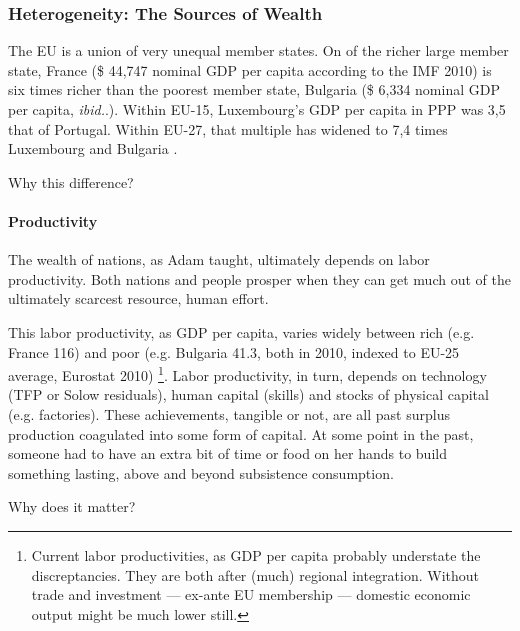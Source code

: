 \documentclass[11pt,a4paper,oneside,openright]{article}
\begin{document}
\subsubsection[Heterogeneity]{Heterogeneity: The Sources of Wealth} \label{sec:sources_of_wealth} The \gls{EU} is a union of very unequal member states. 
On of the richer large member state, France (\$ 44,747 nominal \gls{GDP} per capita according to the IMF 2010) is six times richer than the poorest member state, Bulgaria (\$ 6,334 nominal \gls{GDP} per capita, \emph{ibid.}.). 
Within \gls{EU}-15, Luxembourg's \gls{GDP} per capita in \gls{PPP} was 3,5 that of Portugal. 
Within \gls{EU}-27, that multiple has widened to 7,4 times Luxembourg and Bulgaria \citep[1]{Alber2008}. %

Why this difference?

\paragraph{Productivity} The wealth of nations, as Adam \cite{Smith-1776-lq} taught, ultimately depends on labor productivity. 
Both nations and people prosper when they can get much out of the ultimately scarcest resource, human effort. 

This labor productivity, as \gls{GDP} per capita, varies widely between rich (e.g. France 116) and poor (e.g. Bulgaria 41.3, both in 2010, indexed to EU-25 average, Eurostat 2010)
\footnote{
	Current labor productivities, as \gls{GDP} per capita probably understate the discreptancies. 
	They are both after (much) regional integration. 
	Without trade and investment --- ex-ante EU membership --- domestic economic output might be much lower still.
}. 
Labor productivity, in turn, depends on technology (\gls{TFP} or Solow residuals), human capital (skills) and stocks of physical capital (e.g. factories). 
These achievements, tangible or not, are all past surplus production coagulated into some form of capital. 
At some point in the past, someone had to have an extra bit of time or food on her hands to build something lasting, above and beyond subsistence consumption.

Why does it matter?
\end{document}
